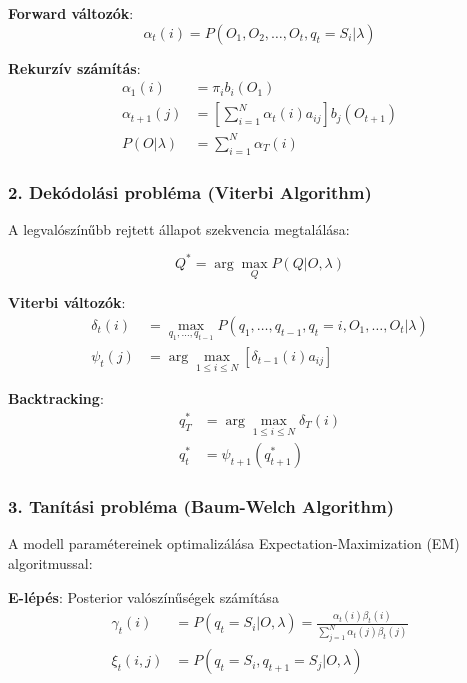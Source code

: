 \textbf{Forward változók}:
\begin{equation}
\alpha_t(i) = P(O_1, O_2, \ldots, O_t, q_t = S_i | \lambda)
\end{equation}

\textbf{Rekurzív számítás}:
\begin{align}
\alpha_1(i) &= \pi_i b_i(O_1) \\
\alpha_{t+1}(j) &= \left[\sum_{i=1}^{N} \alpha_t(i) a_{ij}\right] b_j(O_{t+1}) \\
P(O|\lambda) &= \sum_{i=1}^{N} \alpha_T(i)
\end{align}

\subsubsection{2. Dekódolási probléma (Viterbi Algorithm)}

A legvalószínűbb rejtett állapot szekvencia megtalálása:

\begin{equation}
Q^* = \arg\max_Q P(Q|O, \lambda)
\end{equation}

\textbf{Viterbi változók}:
\begin{align}
\delta_t(i) &= \max_{q_1, \ldots, q_{t-1}} P(q_1, \ldots, q_{t-1}, q_t = i, O_1, \ldots, O_t | \lambda) \\
\psi_t(j) &= \arg\max_{1 \leq i \leq N} [\delta_{t-1}(i) a_{ij}]
\end{align}

\textbf{Backtracking}:
\begin{align}
q_T^* &= \arg\max_{1 \leq i \leq N} \delta_T(i) \\
q_t^* &= \psi_{t+1}(q_{t+1}^*)
\end{align}

\subsubsection{3. Tanítási probléma (Baum-Welch Algorithm)}

A modell paramétereinek optimalizálása Expectation-Maximization (EM) algoritmussal:

\textbf{E-lépés}: Posterior valószínűségek számítása
\begin{align}
\gamma_t(i) &= P(q_t = S_i | O, \lambda) = \frac{\alpha_t(i)\beta_t(i)}{\sum_{j=1}^{N} \alpha_t(j)\beta_t(j)} \\
\xi_t(i,j) &= P(q_t = S_i, q_{t+1} = S_j | O, \lambda)
\end{align}

